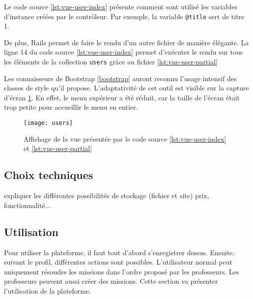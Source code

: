 
Le code source \ref{lst:vue-user-index} présente comment sont utilisé les variables d'instance créées par le contrôleur. Par exemple, la variable \texttt{@title} sert de titre 1.


De plus, Rails permet de faire le rendu d'un autre fichier de manière élégante. La ligne 14 du code source \ref{lst:vue-user-index} permet d'exécuter le rendu sur tous les éléments de la collection \texttt{users} grâce au fichier \ref{lst:vue-user-partial}

Les connaisseurs de Bootstrap \ref{bootstrap} auront reconnu l'usage intensif des classes de style qu'il propose. L'adaptativité de cet outil est visible sur la capture d'écran \ref{fig:vue-users}. En effet, le menu supérieur a été réduit, car la taille de l'écran était trop petite pour accueillir le menu en entier.

\begin{figure}
  \begin{center}
    \texttt{[image: users]}
    \caption{Affichage de la vue présentée par le code source \ref{lst:vue-user-index} et \ref{lst:vue-user-partial}}
    \label{fig:vue-users}
  \end{center}
\end{figure}

\subsection{Choix techniques}
expliquer les différentes possibilités de stockage (fichier et site) prix, fonctionnalité...

\subsection{Utilisation}
Pour utiliser la plateforme, il faut tout d'abord s'enregistrer dessus. Ensuite, suivant le profil, différentes actions sont possibles. L'utilisateur normal peut uniquement résoudre les missions dans l'ordre proposé par les professeurs. Les professeurs peuvent aussi créer des missions. Cette section va présenter l'utilisation de la plateforme.

